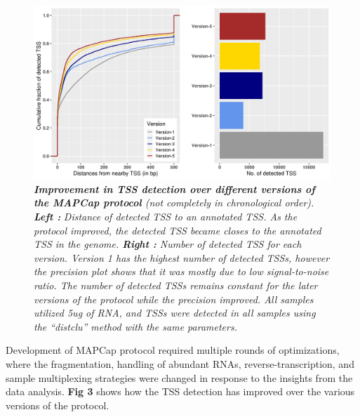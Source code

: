 \documentclass[11pt,twoside]{MPIthesis}
\theoremstyle{definition}
\theoremstyle{definition}
\theoremstyle{definition}
\theoremstyle{remark}
\begin{document}
\begin{figure}

{\centering \includegraphics[width=0.9\linewidth]{figures/results_fig4} 

}

\caption[Improvement in TSS detection over different versions of the MAPCap protocol]{\emph{\textbf{Improvement in TSS detection over different
versions of the MAPCap protocol} (not completely in chronological
order). \textbf{Left :}} \emph{Distance} \emph{of detected TSS to an
annotated TSS. As the protocol improved, the detected TSS became closes
to the annotated TSS in the genome. \textbf{Right :} Number of detected
TSS for each version. Version 1 has the highest number of detected TSSs,
however the precision plot shows that it was mostly due to low
signal-to-noise ratio. The number of detected TSSs remains constant for
the later versions of the protocol while the precision improved. All
samples utilized 5ug of RNA, and TSSs were detected in all samples using
the ``distclu'' method with the same parameters. }}\label{fig:unnamed-chunk-9}
\end{figure}












Development of MAPCap protocol required multiple rounds of
optimizations, where the fragmentation, handling of abundant RNAs,
reverse-transcription, and sample multiplexing strategies were changed
in response to the insights from the data analysis. \textbf{Fig 3} shows
how the TSS detection has improved over the various versions of the
protocol.
\end{document}
